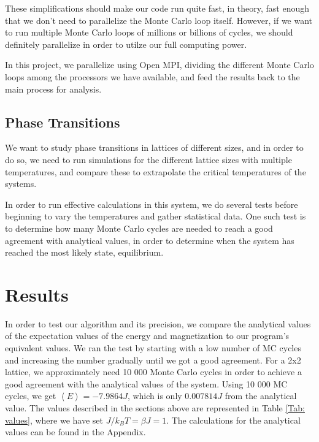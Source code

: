 \documentclass{article}
\begin{document}
		These simplifications should make our code run quite fast, in theory, fast enough that we don't need to parallelize the Monte Carlo loop itself. However, if we want to run multiple Monte Carlo loops of millions or billions of cycles, we should definitely parallelize in order to utilze our full computing power.

		In this project, we parallelize using Open MPI, dividing the different Monte Carlo loops among the processors we have available, and feed the results back to the main process for analysis.

	\subsection{Phase Transitions}
		We want to study phase transitions in lattices of different sizes, and in order to do so, we need to run simulations for the different lattice sizes with multiple temperatures, and compare these to extrapolate the critical temperatures of the systems.

		In order to run effective calculations in this system, we do several tests before beginning to vary the temperatures and gather statistical data. One such test is to determine how many Monte Carlo cycles are needed to reach a good agreement with analytical values, in order to determine when the system has reached the most likely state, equilibrium.

\section{Results}
	In order to test our algorithm and its precision, we compare the analytical values of the expectation values of the energy and magnetization to our program's equivalent values. We ran the test by starting with a low number of MC cycles and increasing the number gradually until we got a good agreement.
	For a 2x2 lattice, we approximately need 10 000 Monte Carlo cycles in order to achieve a good agreement with the analytical values of the system. Using 10 000 MC cycles, we get $\left<E\right> = -7.9864 J$, which is only $0.007814 J$ from the analytical value. The values described in the sections above are represented in Table \ref{Tab: values}, where we have set $J/k_BT =\beta J = 1$. The calculations for the analytical values can be found in the Appendix.
\end{document}
